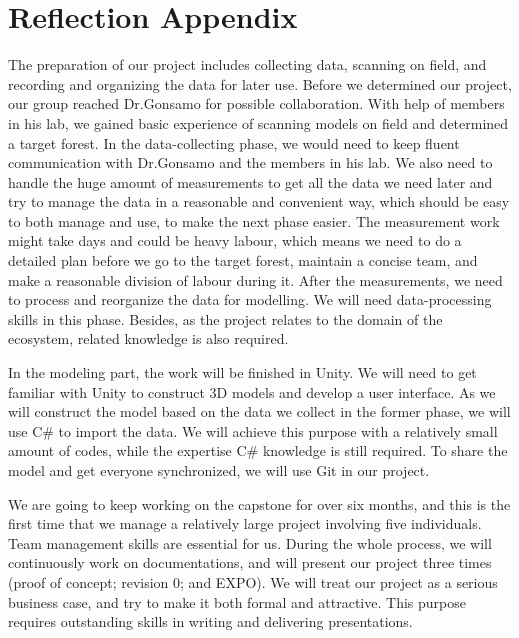 \documentclass{article}
\begin{document}
\appendix
\section{Reflection Appendix}

The preparation of our project includes collecting data, scanning on field, and recording and organizing the data for later use. Before we determined our project, our group reached Dr.Gonsamo for possible collaboration. With help of members in his lab, we gained basic experience of scanning models on field and determined a target forest. In the data-collecting phase, we would need to keep fluent communication with Dr.Gonsamo and the members in his lab. We also need to handle the huge amount of measurements to get all the data we need later and try to manage the data in a reasonable and convenient way, which should be easy to both manage and use, to make the next phase easier. The measurement work might take days and could be heavy labour, which means we need to do a detailed plan before we go to the target forest, maintain a concise team, and make a reasonable division of labour during it. After the measurements, we need to process and reorganize the data for modelling. We will need data-processing skills in this phase. Besides, as the project relates to the domain of the ecosystem, related knowledge is also required. 

In the modeling part, the work will be finished in Unity. We will need to get familiar with Unity to construct 3D models and develop a user interface. As we will construct the model based on the data we collect in the former phase, we will use C\# to import the data. We will achieve this purpose with a relatively small amount of codes, while the expertise C\# knowledge is still required. To share the model and get everyone synchronized, we will use Git in our project. 

We are going to keep working on the capstone for over six months, and this is the first time that we manage a relatively large project involving five individuals. Team management skills are essential for us. During the whole process, we will continuously work on documentations, and will present our project three times (proof of concept; revision 0; and EXPO). We will treat our project as a serious business case, and try to make it both formal and attractive. This purpose requires outstanding skills in writing and delivering presentations. 
\end{document}
